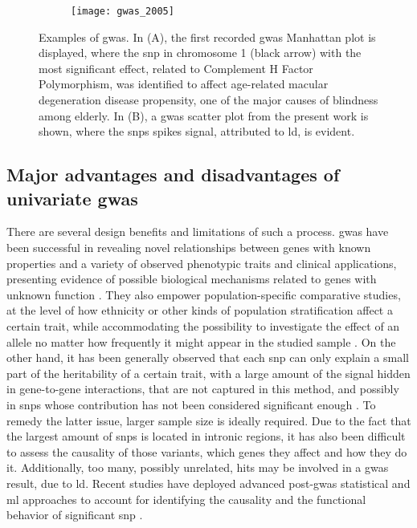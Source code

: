  \begin{figure}[H]
 	\begin{subfigure}[t]{0.45\textwidth}
	\centering
	\texttt{[image: gwas\_2005]}
	\caption{}
	\label{fig:gwas_2005}
	\end{subfigure}
	\hfill
	\begin{subfigure}[t]{0.6\textwidth}
		\centering
		
		\caption{}
		\label{fig:gwas_example}
	\end{subfigure}
	\caption[Examples of \acs{gwas} Manhattan plots \cite{Klein2005}]{Examples of \ac{gwas}. In (A), the first recorded \ac{gwas} Manhattan plot \cite{Klein2005} is displayed, where the \ac{snp} in chromosome 1 (black arrow) with the most significant  effect, related to Complement H Factor Polymorphism, was identified to affect age-related macular degeneration disease propensity, one of the major causes of blindness among elderly. In (B), a \ac{gwas} scatter plot from the present work is shown, where the \acp{snp} spikes signal, attributed to \ac{ld}, is evident.}
\end{figure}

\subsection{Major advantages and disadvantages of univariate \ac{gwas}}

There are several design benefits and limitations of such a process. \ac{gwas} have been successful in revealing novel relationships between genes with known properties and a variety of observed phenotypic traits and clinical applications, presenting evidence of possible biological mechanisms related to genes with unknown function \cite{Tam2019}. They also empower population-specific comparative studies, at the level of how ethnicity or other kinds of population stratification affect a certain trait, while accommodating the possibility to investigate the effect of an allele no matter how frequently it might appear in the studied sample \cite{Tam2019}. 
On the other hand, it has been generally observed  that each \ac{snp} can only explain a small part of the heritability of a certain trait, with a large amount of the signal hidden in gene-to-gene interactions, that are not captured in this method, and possibly in \acp{snp} whose contribution has not been considered significant enough  \cite{Tam2019}. To remedy the latter issue, larger sample size is ideally required. Due to the fact that the largest amount of \acp{snp} is located in intronic regions, it has also been difficult to assess the causality of those variants, which genes they affect and how they do it. Additionally, too many, possibly unrelated, hits may be involved in a \ac{gwas} result, due to \ac{ld}. \cite{Tam2019} Recent studies have deployed advanced post-\ac{gwas} statistical and \ac{ml} approaches to account for identifying the causality and the functional behavior of significant \ac{snp}  \cite{Nicholls2020,Gallagher2018}. 

